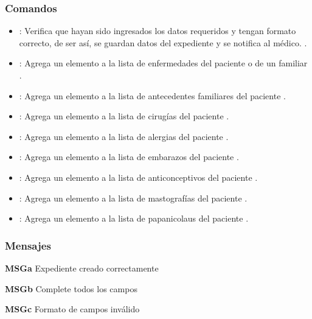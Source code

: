 \subsubsection{Comandos}
\begin{itemize}
	\item {}:  Verifica que hayan sido ingresados los datos requeridos y tengan formato correcto, de ser así, se guardan datos del expediente y se notifica al médico.  .	
	\item {}:  Agrega un elemento a la lista de enfermedades del paciente o de un familiar .
	\item {}:  Agrega un elemento a la lista de antecedentes familiares del paciente .
	\item {}:  Agrega un elemento a la lista de cirugías del paciente .
	\item {}:  Agrega un elemento a la lista de alergias del paciente .
	\item {}:  Agrega un elemento a la lista de embarazos del paciente .
	\item {}:  Agrega un elemento a la lista de anticonceptivos del paciente .
	\item {}:  Agrega un elemento a la lista de mastografías del paciente .
	\item {}:  Agrega un elemento a la lista de papanicolaus del paciente .
\end{itemize}

\subsubsection{Mensajes}
\begin{Citemize}
	\item {\bf MSGa} Expediente creado correctamente
	\item {\bf MSGb} Complete todos los campos
	\item {\bf MSGc} Formato de campos inválido
\end{Citemize}

